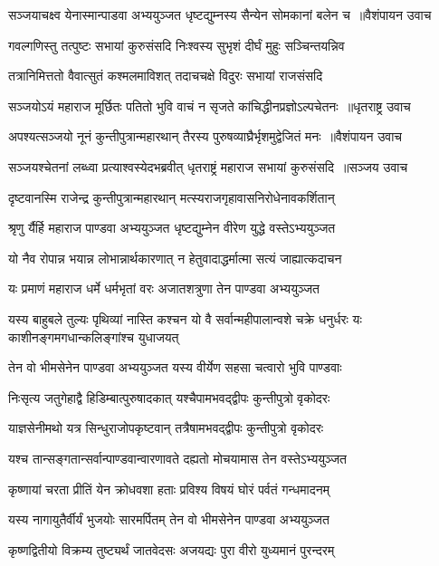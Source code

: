 \threelineshloka
{सञ्जयाचक्ष्व येनास्मान्पाडवा अभ्ययुञ्जत}
{धृष्टद्युम्नस्य सैन्येन सोमकानां बलेन च ॥वैशंपायन उवाच}
{}


\twolineshloka
{गवल्गणिस्तु तत्पुष्टः सभायां कुरुसंसदि}
{निःश्वस्य सुभृशं दीर्घं मुहुः सञ्चिन्तयन्निव}


\twolineshloka
{तत्रानिमित्ततो वैवात्सुतं कश्मलमाविशत्}
{तदाचचक्षे विदुरः सभायां राजसंसदि}


\threelineshloka
{सञ्जयोऽयं महाराज मूर्छितः पतितो भुवि}
{वाचं न सृजते कांचिद्धीनप्रज्ञोऽल्पचेतनः ॥धृतराष्ट्र उवाच}
{}


\threelineshloka
{अपश्यत्सञ्जयो नूनं कुन्तीपुत्रान्महारथान्}
{तैरस्य पुरुषव्याघ्रैर्भृशमुद्वेजितं मनः ॥वैशंपायन उवाच}
{}


\threelineshloka
{सञ्जयश्चेतनां लब्ध्वा प्रत्याश्वस्येदभब्रवीत्}
{धृतराष्ट्रं महाराज सभायां कुरुसंसदि ॥सञ्जय उवाच}
{}


\twolineshloka
{दृष्टवानस्मि राजेन्द्र कुन्तीपुत्रान्महारथान्}
{मत्स्यराजगृहावासनिरोधेनावकर्शितान्}


\twolineshloka
{श्रृणु र्यैर्हि महाराज पाण्डवा अभ्ययुञ्जत}
{धृष्टद्युम्नेन वीरेण युद्धे वस्तेऽभ्ययुञ्जत}


\twolineshloka
{यो नैव रोपान्न भयान्न लोभान्नार्थकारणात्}
{न हेतुवादाद्धर्मात्मा सत्यं जाह्यात्कदाचन}


\twolineshloka
{यः प्रमाणं महाराज धर्मे धर्मभृतां वरः}
{अजातशत्रुणा तेन पाण्डवा अभ्ययुञ्जत}


\threelineshloka
{यस्य बाहुबले तुल्यः पृथिव्यां नास्ति कश्चन}
{यो वै सर्वान्महीपालान्वशे चक्रे धनुर्धरः}
{यः काशीनङ्गमगधान्कलिङ्गांश्च युधाजयत्}


\twolineshloka
{तेन वो भीमसेनेन पाण्डवा अभ्ययुञ्जत}
{यस्य वीर्येण सहसा चत्वारो भुवि पाण्डवाः}


\twolineshloka
{निःसृत्य जतुगेहाद्वै हिडिम्बात्पुरुषादकात्}
{यश्चैपामभवद्द्वीपः कुन्तीपुत्रो वृकोदरः}


\twolineshloka
{याज्ञसेनीमथो यत्र सिन्धुराजोपकृष्टवान्}
{तत्रैषामभवद्द्वीपः कुन्तीपुत्रो वृकोदरः}


\twolineshloka
{यश्च तान्सङ्गतान्सर्वान्पाण्डवान्वारणावते}
{दह्यतो मोचयामास तेन वस्तेऽभ्ययुञ्जत}


\twolineshloka
{कृष्णायां चरता प्रीतिं येन क्रोधवशा हताः}
{प्रविश्य विषयं घोरं पर्वतं गन्धमादनम्}


\twolineshloka
{यस्य नागायुतैर्वीर्यं भुजयोः सारमर्पितम्}
{तेन वो भीमसेनेन पाण्डवा अभ्ययुञ्जत}


\twolineshloka
{कृष्णद्वितीयो विक्रम्य तुष्ट्यर्थं जातवेदसः}
{अजयद्यः पुरा वीरो युध्यमानं पुरन्दरम्}


